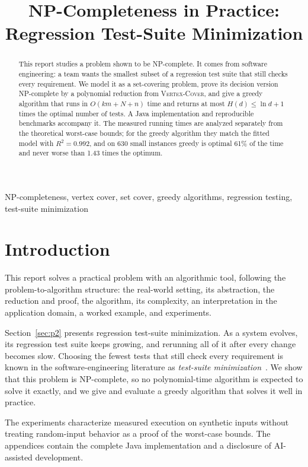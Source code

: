 \documentclass[conference]{IEEEtran}
\title{NP-Completeness in Practice:\\Regression Test-Suite Minimization}
\author{\IEEEauthorblockN{Avantika Holla Sathyanarayana}
\IEEEauthorblockA{Department of Computer and Information Science\\
University of Florida\\
Email: avantika.sathyan@ufl.edu}}
\theoremstyle{definition}
\theoremstyle{remark}
\newcommand{\VC}{\textsc{Vertex-Cover}}
\begin{document}
\maketitle

\begin{abstract}
This report studies a problem shown to be NP-complete. It comes from
software engineering: a team wants the smallest subset of a regression test
suite that still checks every requirement. We model it as a set-covering
problem, prove its decision version NP-complete by a polynomial reduction
from \VC{}, and give a greedy algorithm that runs in $O(km + N + n)$ time and
returns at most $H(d) \le \ln d + 1$ times the optimal number of tests. A Java
implementation and reproducible benchmarks accompany it. The measured running
times are analyzed separately from the theoretical worst-case bounds; for the
greedy algorithm they match the fitted model with $R^2 = 0.992$, and on 630
small instances greedy is optimal 61\% of the time and never worse than
1.43 times the optimum.
\end{abstract}

\begin{IEEEkeywords}
NP-completeness, vertex cover, set cover, greedy algorithms,
regression testing, test-suite minimization
\end{IEEEkeywords}

\section{Introduction}
This report solves a practical problem with an algorithmic tool, following
the problem-to-algorithm structure: the real-world setting, its abstraction,
the reduction and proof, the algorithm, its complexity, an interpretation in
the application domain, a worked example, and experiments.

Section~\ref{sec:p2} presents regression test-suite minimization. As a
system evolves, its regression test suite keeps growing, and rerunning all of
it after every change becomes slow. Choosing the fewest tests that still check
every requirement is known in the software-engineering literature as
\emph{test-suite minimization}~\cite{harrold1993,yoo2012}. We show that this
problem is NP-complete, so no polynomial-time algorithm is expected to solve it
exactly, and we give and evaluate a greedy algorithm that solves it well in
practice.

The experiments characterize measured execution on synthetic inputs without
treating random-input behavior as a proof of the worst-case bounds. The
appendices contain the complete Java implementation and a disclosure of
AI-assisted development.
\end{document}
